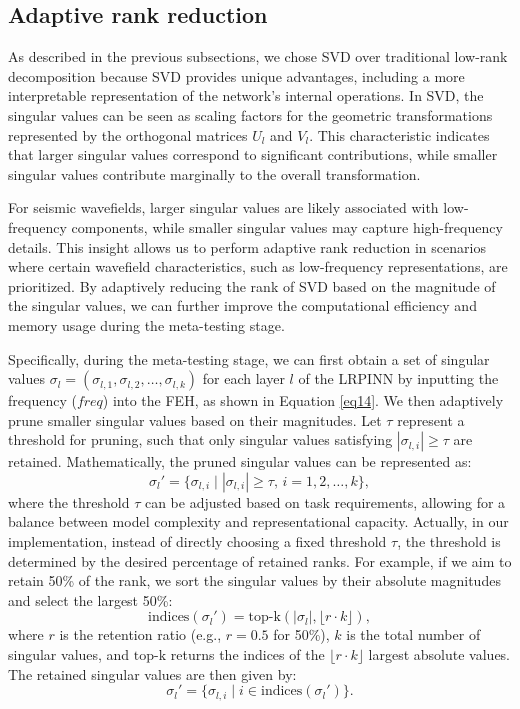 \subsection{Adaptive rank reduction}\label{method4}
As described in the previous subsections, we chose SVD over traditional low-rank decomposition because SVD provides unique advantages, including a more interpretable representation of the network's internal operations. In SVD, the singular values can be seen as scaling factors for the geometric transformations represented by the orthogonal matrices $U_l$ and $V_l$. This characteristic indicates that larger singular values correspond to significant contributions, while smaller singular values contribute marginally to the overall transformation. 

For seismic wavefields, larger singular values are likely associated with low-frequency components, while smaller singular values may capture high-frequency details. This insight allows us to perform adaptive rank reduction in scenarios where certain wavefield characteristics, such as low-frequency representations, are prioritized. By adaptively reducing the rank of SVD based on the magnitude of the singular values, we can further improve the computational efficiency and memory usage during the meta-testing stage. 

Specifically, during the meta-testing stage, we can first obtain a set of singular values $\sigma_l = (\sigma_{l,1}, \sigma_{l,2}, \dots, \sigma_{l,k})$ for each layer $l$ of the LRPINN by inputting the frequency ($\textit{freq}$) into the FEH, as shown in Equation \ref{eq14}. We then adaptively prune smaller singular values based on their magnitudes. Let $ \tau $ represent a threshold for pruning, such that only singular values satisfying $|\sigma_{l,i}| \geq \tau$ are retained. Mathematically, the pruned singular values can be represented as:
\begin{equation}\label{eq17}
\sigma_l' = \{\sigma_{l,i} \mid |\sigma_{l,i}| \geq \tau, \, i = 1, 2, \dots, k\},
\end{equation}
where the threshold $\tau$ can be adjusted based on task requirements, allowing for a balance between model complexity and representational capacity. Actually, in our implementation, instead of directly choosing a fixed threshold $\tau$, the threshold is determined by the desired percentage of retained ranks. For example, if we aim to retain 50\% of the rank, we sort the singular values by their absolute magnitudes and select the largest 50\%:
\begin{equation}\label{eq18}
\text{indices}(\sigma_l') = \text{top-k}(|\sigma_l|, \lfloor r \cdot k \rfloor),
\end{equation}
where $r$ is the retention ratio (e.g., $r=0.5$ for 50\%), $k$ is the total number of singular values, and $\text{top-k}$ returns the indices of the $\lfloor r \cdot k \rfloor$ largest absolute values. The retained singular values are then given by:
\begin{equation}\label{eq19}
\sigma_l' = \{\sigma_{l,i} \mid i \in \text{indices}(\sigma_l')\}.
\end{equation}

